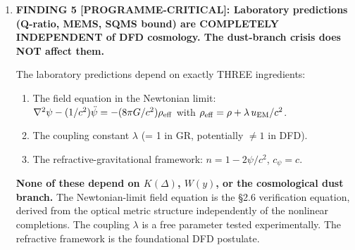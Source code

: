 \documentclass[11pt]{article}
\newcommand{\ee}[1]{\times 10^{#1}}
\newcommand{\Qpsi}{Q_\psi}
\newcommand{\lbone}{|\lambda - 1|}
\theoremstyle{definition}
\theoremstyle{remark}
\begin{document}
\begin{tcolorbox}[colback=blue!5!white, colframe=blue!60!black,
  title=\textbf{W4i18 P2: SQMS BOUND REASSESSMENT --- 5 KEY RESULTS}]
\begin{enumerate}
  \textbf{Realistic reach} (accounting for systematic degradation
  factor $\sim 10\times$ from seismic, thermal gradients, EM pickup):
  \begin{equation}
  \boxed{\lbone_{\rm MEMS,realistic} \sim 3\ee{-19}.}
  \tag{F4d}
  \end{equation}

  \textbf{Conservative reach} (single membrane, $Q_m = 10^8$,
  $d = 50~\mu$m, $U = 100$~J, $t = 10^5$~s, systematics $\times 10$):
  \begin{equation}
  \boxed{\lbone_{\rm MEMS,conservative} \sim 3\ee{-16}.}
  \tag{F4e}
  \end{equation}

  \textbf{All three estimates exceed the tightened SQMS bound of
  $2.7\ee{-13}$ by 3--7 orders of magnitude.} The MEMS DC channel is
  the deepest probe of $\lambda$ in the DFD programme, and it is
  completely independent of $\Qpsi$.

  \textbf{Key systematic}: EM coupling between cavity fringe fields
  and the membrane. Mitigation: superconducting (Al or Nb) ground plane
  between cavity and MEMS, $\psi$-transparent but EM-opaque.
  Residual EM force at $d = 50~\mu$m through ground plane:
  $F_{\rm EM} \sim 10^{-20}$~N (Casimir at 50~$\mu$m separation),
  comparable to $F_\psi$ at $\lbone \sim 10^{-9}$.
  \textbf{Casimir background is the ultimate systematic.} Modulation
  (chopping the cavity RF) distinguishes $\psi$-signal (tracks $U_{\rm EM}$)
  from Casimir (constant).

\item \textbf{FINDING 5 [PROGRAMME-CRITICAL]: Laboratory predictions
  (Q-ratio, MEMS, SQMS bound) are COMPLETELY INDEPENDENT of DFD
  cosmology. The dust-branch crisis does NOT affect them.}

  The laboratory predictions depend on exactly THREE ingredients:
  \begin{enumerate}[nosep]
  \item The field equation in the Newtonian limit:
    $\nabla^2\psi - (1/c^2)\ddot\psi = -(8\pi G/c^2)\rho_{\rm eff}$
    with $\rho_{\rm eff} = \rho + \lambda\,u_{\rm EM}/c^2$.
  \item The coupling constant $\lambda$ (= 1 in GR, potentially
    $\neq 1$ in DFD).
  \item The refractive-gravitational framework: $n = 1 - 2\psi/c^2$,
    $c_\psi = c$.
  \end{enumerate}

  \textbf{None of these depend on $K(\Delta)$, $W(y)$, or the
  cosmological dust branch.} The Newtonian-limit field equation is
  the \S2.6 verification equation, derived from the optical metric
  structure independently of the nonlinear completions. The coupling
  $\lambda$ is a free parameter tested experimentally. The refractive
  framework is the foundational DFD postulate.


\end{enumerate}
\end{tcolorbox}
\end{document}

